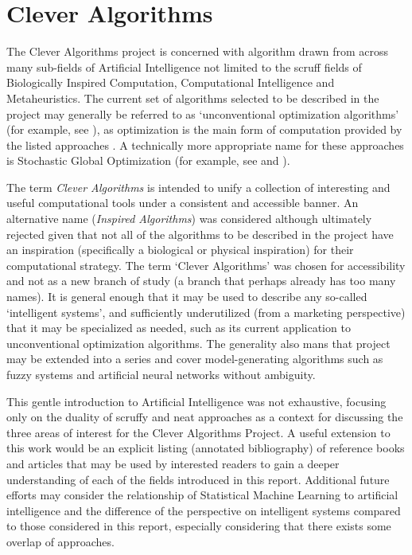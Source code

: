 \documentclass[a4paper, 11pt]{article}
\begin{document}
% 
% 
\section{Clever Algorithms}
\label{sec:clever_algorithms}
The Clever Algorithms project is concerned with algorithm drawn from across many sub-fields of Artificial Intelligence not limited to the scruff fields of Biologically Inspired Computation, Computational Intelligence and Metaheuristics. 
The current set of algorithms selected to be described in the project may generally be referred to as `unconventional optimization algorithms' (for example, see \cite{Corne1999}), as optimization is the main form of computation provided by the listed approaches \cite{Brownlee2010b}. A technically more appropriate name for these approaches is Stochastic Global Optimization (for example, see \cite{Weise2007} and \cite{Luke2009}).

The term \emph{Clever Algorithms} is intended to unify a collection of interesting and useful computational tools under a consistent and accessible banner. An alternative name (\emph{Inspired Algorithms}) was considered although ultimately rejected given that not all of the algorithms to be described in the project have an inspiration (specifically a biological or physical inspiration) for their computational strategy. The term `Clever Algorithms' was chosen for accessibility and not as a new branch of study (a branch that perhaps already has too many names). It is general enough that it may be used to describe any so-called `intelligent systems', and sufficiently underutilized (from a marketing perspective) that it may be specialized as needed, such as its current application to unconventional optimization algorithms. The generality also mans that project may be extended into a series and cover model-generating algorithms such as fuzzy systems and artificial neural networks without ambiguity.

This gentle introduction to Artificial Intelligence was not exhaustive, focusing only on the duality of scruffy and neat approaches as a context for discussing the three areas of interest for the Clever Algorithms Project. A useful extension to this work would be an explicit listing (annotated bibliography) of reference books and articles that may be used by interested readers to gain a deeper understanding of each of the fields introduced in this report. Additional future efforts may consider the relationship of Statistical Machine Learning to artificial intelligence and the difference of the perspective on intelligent systems compared to those considered in this report, especially considering that there exists some overlap of approaches. 



\end{document}
